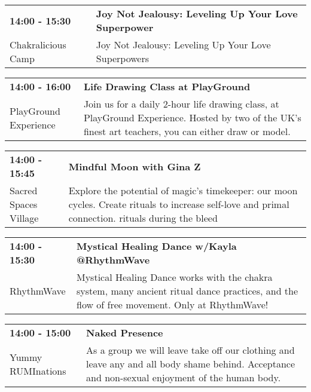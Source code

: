 \begin{tabular}{ p{1in} p{2.2in} }
    \textbf{14:00 - 15:30} & \textbf{Joy Not Jealousy: Leveling Up Your Love Superpower} \\
    Chakralicious Camp \newline  & Joy Not Jealousy: Leveling Up Your Love Superpowers \\
    \hline 
\end{tabular}
    
\begin{tabular}{ p{1in} p{2.2in} }
    \textbf{14:00 - 16:00} & \textbf{Life Drawing Class at PlayGround} \\
    PlayGround Experience \newline  & Join us for a daily 2-hour life drawing class, at PlayGround Experience. Hosted by two of the UK's finest art teachers, you can either draw or model. \\
    \hline 
\end{tabular}
    
\begin{tabular}{ p{1in} p{2.2in} }
    \textbf{14:00 - 15:45} & \textbf{Mindful Moon with Gina Z} \\
    Sacred Spaces Village \newline  & Explore the potential of magic's timekeeper: our moon cycles. Create rituals to increase self-love and primal connection.   
rituals during the bleed \\
    \hline 
\end{tabular}
    
\begin{tabular}{ p{1in} p{2.2in} }
    \textbf{14:00 - 15:30} & \textbf{Mystical Healing Dance w/Kayla @RhythmWave} \\
    RhythmWave \newline  & Mystical Healing Dance works with the chakra system, many ancient ritual dance practices, and the flow of free movement. Only at RhythmWave! \\
    \hline 
\end{tabular}
    
\begin{tabular}{ p{1in} p{2.2in} }
    \textbf{14:00 - 15:00} & \textbf{Naked Presence} \\
    Yummy RUMInations \newline  & As a group we will leave take off our clothing and leave any and all body shame behind.  Acceptance and non-sexual enjoyment of the human body. \\
    \hline 
\end{tabular}
    
